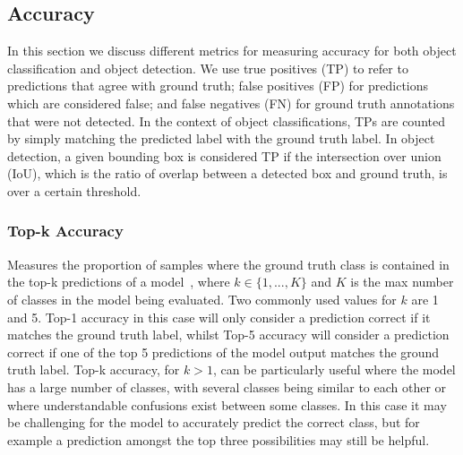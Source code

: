 \subsection{Accuracy}
In this section we discuss different metrics for measuring accuracy for both object classification and object detection.
%
We use true positives (TP) to refer to predictions that agree with ground truth; false positives (FP) for predictions which are considered false; and false negatives (FN) for ground truth annotations that were not detected.
%
In the context of object classifications, TPs are counted by simply matching the predicted label with the ground truth label. 
%
In object detection, a given bounding box is considered TP if the intersection over union (IoU), which is the ratio of overlap between a detected box and ground truth, is over a certain threshold.

\subsubsection{Top-k Accuracy}
%
Measures the proportion of samples where the ground truth class is contained in the top-k predictions of a model~\cite{petersen2022differentiable}, 
%
where $k \in \{1, ...,  K\}$ and $K$ is the max number of classes in the model being evaluated.
%
Two commonly used values for $k$ are 1 and 5. Top-1 accuracy in this case will only consider a prediction correct if it matches the ground truth label, whilst Top-5 accuracy will consider a prediction correct if one of the top 5 predictions of the model output matches the ground truth label. 
%
Top-k accuracy, for $k>1$, can be particularly useful where the model has a large number of classes, with several classes being similar to each other or where understandable confusions exist between some classes. %
%
In this case it may be challenging for the model to accurately predict the correct class, but for example a prediction amongst the top three possibilities may still be helpful.





